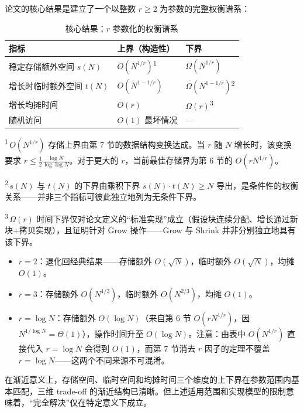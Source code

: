 \documentclass[12pt,a4paper]{ctexart}
\begin{document}
论文的核心结果是建立了一个以整数 $r \ge 2$ 为参数的完整权衡谱系：

\begin{table}[htbp]
\centering
\caption{核心结果：$r$ 参数化的权衡谱系}
\begin{tabular}{@{}lll@{}}
\toprule
\textbf{指标} & \textbf{上界（构造性）} & \textbf{下界} \\
\midrule
稳定存储额外空间 $s(N)$ & $O(N^{1/r})$\textsuperscript{1} & $\Omega(N^{1/r})$ \\
增长时临时额外空间 $t(N)$ & $O(N^{1-1/r})$ & $\Omega(N^{1-1/r})$\textsuperscript{2} \\
增长均摊时间 & $O(r)$ & $\Omega(r)$\textsuperscript{3} \\
随机访问 & $O(1)$ 最坏情况 & — \\
\bottomrule
\end{tabular}
\end{table}

\medskip
\noindent\textsuperscript{1}\,$O(N^{1/r})$ 存储上界由第 7 节的数据结构变换达成。当 $r$ 随 $N$ 增长时，该变换要求 $r \le \frac{1}{2}\frac{\log N}{\log\log N}$。对于更大的 $r$，当前最佳存储界为第 6 节的 $O(rN^{1/r})$。

\noindent\textsuperscript{2}\,$s(N)$ 与 $t(N)$ 的下界由乘积下界 $s(N)\cdot t(N) \ge N$ 导出，是条件性的权衡关系——并非三个指标可彼此独立地列为无条件下界。

\noindent\textsuperscript{3}\,$\Omega(r)$ 时间下界仅对论文定义的``标准实现''成立（假设块连续分配、增长通过新块$+$拷贝实现），且证明针对 Grow 操作——Grow 与 Shrink 并非分别独立地具有该下界。

\begin{itemize}[leftmargin=*]
    \item $r = 2$：退化回经典结果——存储额外 $O(\sqrt{N})$，临时额外 $O(\sqrt{N})$，均摊 $O(1)$。
    \item $r = 3$：存储额外 $O(N^{1/3})$，临时额外 $O(N^{2/3})$，均摊 $O(1)$。
    \item $r = \log N$：存储额外 $O(\log N)$（来自第 6 节 $O(rN^{1/r})$，因 $N^{1/\log N} = \Theta(1)$），操作时间升至 $O(\log N)$。注意：由表中 $O(N^{1/r})$ 直接代入 $r = \log N$ 会得到 $O(1)$，而第 7 节消去 $r$ 因子的定理不覆盖 $r = \log N$——这两个不同来源不可混淆。
\end{itemize}

在渐近意义上，存储空间、临时空间和均摊时间三个维度的上下界在参数范围内基本匹配，三维 trade-off 的渐近结构已清晰。但上述适用范围和实现模型的限制意味着，``完全解决''仅在特定意义下成立。
\end{document}
